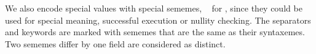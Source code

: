 


We also encode special values with special sememes, \eg 
~ for , since they could be used for special
meaning, \eg successful execution or nullity checking. The
separators and keywords are marked with
sememes that are the same as their syntaxemes. Two sememes differ by
one field are considered as distinct.




